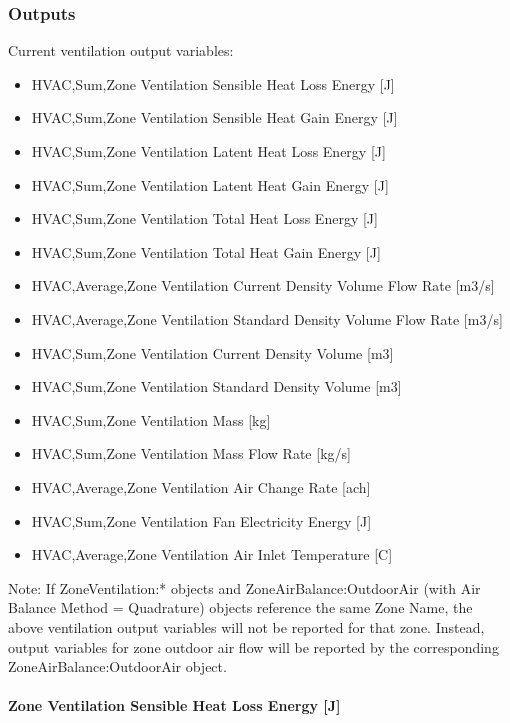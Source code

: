 \subsubsection{Outputs}\label{outputs-1-002}

Current ventilation output variables:

\begin{itemize}
\item
  HVAC,Sum,Zone Ventilation Sensible Heat Loss Energy {[}J{]}
\item
  HVAC,Sum,Zone Ventilation Sensible Heat Gain Energy {[}J{]}
\item
  HVAC,Sum,Zone Ventilation Latent Heat Loss Energy {[}J{]}
\item
  HVAC,Sum,Zone Ventilation Latent Heat Gain Energy {[}J{]}
\item
  HVAC,Sum,Zone Ventilation Total Heat Loss Energy {[}J{]}
\item
  HVAC,Sum,Zone Ventilation Total Heat Gain Energy {[}J{]}
\item
  HVAC,Average,Zone Ventilation Current Density Volume Flow Rate {[}m3/s{]}
\item
  HVAC,Average,Zone Ventilation Standard Density Volume Flow Rate {[}m3/s{]}
\item
  HVAC,Sum,Zone Ventilation Current Density Volume {[}m3{]}
\item
  HVAC,Sum,Zone Ventilation Standard Density Volume {[}m3{]}
\item
  HVAC,Sum,Zone Ventilation Mass {[}kg{]}
\item
  HVAC,Sum,Zone Ventilation Mass Flow Rate {[}kg/s{]}
\item
  HVAC,Average,Zone Ventilation Air Change Rate {[}ach{]}
\item
  HVAC,Sum,Zone Ventilation Fan Electricity Energy {[}J{]}
\item
  HVAC,Average,Zone Ventilation Air Inlet Temperature {[}C{]}
\end{itemize}

Note: If ZoneVentilation:* objects and ZoneAirBalance:OutdoorAir (with Air Balance Method = Quadrature) objects reference the same Zone Name, the above ventilation output variables will not be reported for that zone. Instead, output variables for zone outdoor air flow will be reported by the corresponding ZoneAirBalance:OutdoorAir object.

\paragraph{Zone Ventilation Sensible Heat Loss Energy {[}J{]}}\label{zone-ventilation-sensible-heat-loss-energy-j}

